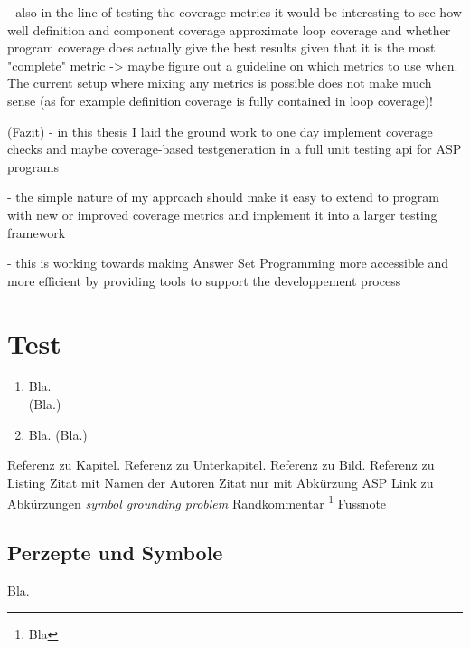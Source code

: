 - also in the line of testing the coverage metrics it would be interesting to see how well definition and component coverage approximate 
loop coverage and whether program coverage does actually give the best results given that it is the most "complete" metric
-> maybe figure out a guideline on which metrics to use when. The current setup where mixing any metrics is possible does not make much 
sense (as for example definition coverage is fully contained in loop coverage)!


(Fazit)
- in this thesis I laid the ground work to one day implement coverage checks and maybe coverage-based testgeneration in a full unit 
testing api for ASP programs

- the simple nature of my approach should make it easy to extend to program with new or improved coverage metrics and implement it 
into a larger testing framework

- this is working towards making Answer Set Programming more accessible and more efficient by providing tools to support the 
developpement process



\chapter{Test}
\label{ch:Test}

\begin{enumerate}
    \item Bla.\\
    (Bla.)
    \item Bla. (Bla.)
\end{enumerate}

 Referenz zu Kapitel.
 Referenz zu Unterkapitel. 
 Referenz zu Bild.
 Referenz zu Listing
\textcite{Jan+10} Zitat mit Namen der Autoren
\cite{Jan+10} Zitat nur mit Abkürzung
\ac{ASP} Link zu Abkürzungen
\emph{symbol grounding problem} 
 Randkommentar
\footnote{Bla} Fussnote

\section{Perzepte und Symbole}
\label{sec:Test/Perzepte_und_Symbole}
Bla.


